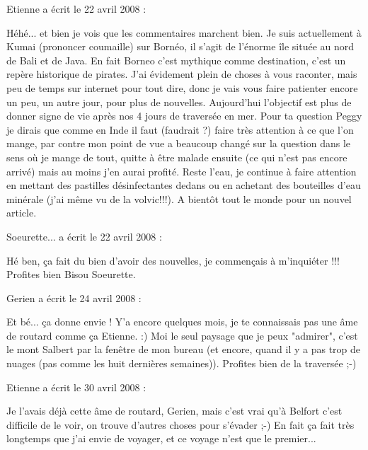 \medskip
Etienne a écrit le 22 avril 2008 :
\begin{displayquote}
Héhé... et bien je vois que les commentaires marchent bien.
Je suis actuellement à Kumai (prononcer coumaille) sur Bornéo, il s'agit de l'énorme île située au nord de Bali et de Java.
En fait Borneo c'est mythique comme destination, c'est un repère historique de pirates.
J'ai évidement plein de choses à vous raconter, mais peu de temps sur internet pour tout dire, donc je vais vous faire patienter encore un peu, un autre jour, pour plus de nouvelles. Aujourd'hui l'objectif est plus de donner signe de vie après nos 4 jours de traversée en mer.
Pour ta question Peggy je dirais que comme en Inde il faut (faudrait ?) faire très attention à ce que l'on mange, par contre mon point de vue a beaucoup changé sur la question dans le sens où je mange de tout, quitte à être malade ensuite (ce qui n'est pas encore arrivé) mais au moins j'en aurai profité. Reste l'eau, je continue à faire attention en mettant des pastilles désinfectantes dedans ou en achetant des bouteilles d'eau minérale (j'ai même vu de la volvic!!!).
A bientôt tout le monde pour un nouvel article.
\end{displayquote}

\medskip
Soeurette... a écrit le 22 avril 2008 :
\begin{displayquote}
Hé ben, ça fait du bien d'avoir des nouvelles, je commençais à m'inquiéter !!!
Profites bien
Bisou
Soeurette.
\end{displayquote}

\medskip
Gerien a écrit le 24 avril 2008 :
\begin{displayquote}
Et bé... ça donne envie !
Y'a encore quelques mois, je te connaissais pas une âme de routard comme ça Etienne. :)
Moi le seul paysage que je peux "admirer", c'est le mont Salbert par la fenêtre de mon bureau (et encore, quand il y a pas trop de nuages (pas comme les huit dernières semaines)).
Profites bien de la traversée ;-)
\end{displayquote}

\medskip
Etienne a écrit le 30 avril 2008 :
\begin{displayquote}
Je l'avais déjà cette âme de routard, Gerien, mais c'est vrai qu'à Belfort c'est difficile de le voir, on trouve d'autres choses pour s'évader ;-) En fait ça fait très longtemps que j'ai envie de voyager, et ce voyage n'est que le premier...
\end{displayquote}

\vfill
